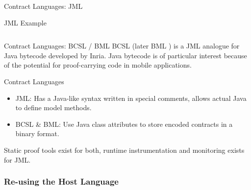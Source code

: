 \documentclass[12pt]{beamer}
\begin{document}
\begin{frame}[fragile]{Contract Languages: \small JML}
\end{frame}

\begin{frame}{JML Example}
  \inputminted[fontsize=\footnotesize]{java}{jmlstack.java}
\end{frame}

\begin{frame}{Contract Languages: \small BCSL / BML}
  BCSL \parencite{bcsl} (later BML \parencite{bml}) is a JML analogue
  for Java bytecode developed by Inria. Java bytecode is of particular
  interest because of the potential for proof-carrying code in mobile
  applications.
\end{frame}

\begin{frame}{Contract Languages}
  \begin{itemize}
    \item JML: Has a Java-like syntax written in special comments,
      allows actual Java to define model methods.

    \item BCSL \& BML: Use Java class attributes to store encoded
      contracts in a binary format.
  \end{itemize}

  Static proof tools exist for both, runtime instrumentation and
  monitoring exists for JML.
\end{frame}

\subsubsection{Re-using the Host Language}
\label{sec:runver-sbc-aop}
\end{document}
